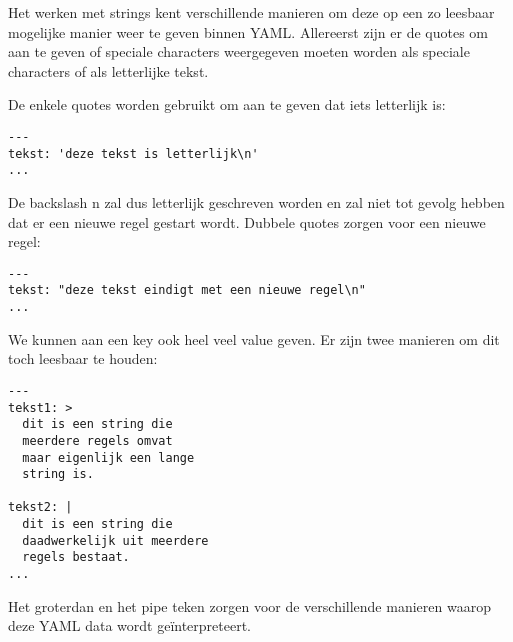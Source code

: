 Het werken met strings kent verschillende manieren om deze op een zo leesbaar mogelijke manier weer te geven binnen YAML. Allereerst zijn er de quotes om aan te geven of speciale characters weergegeven moeten worden als speciale characters of als letterlijke tekst.

De enkele quotes worden gebruikt om aan te geven dat iets letterlijk is:
\begin{verbatim}
---
tekst: 'deze tekst is letterlijk\n'
...
\end{verbatim}
De backslash n zal dus letterlijk geschreven worden en zal niet tot gevolg hebben dat er een nieuwe regel gestart wordt. Dubbele quotes zorgen voor een nieuwe regel:
\begin{verbatim}
---
tekst: "deze tekst eindigt met een nieuwe regel\n"
...
\end{verbatim}

We kunnen aan een key ook heel veel value geven. Er zijn twee manieren om dit toch leesbaar te houden:
\begin{verbatim}
---
tekst1: >
  dit is een string die
  meerdere regels omvat
  maar eigenlijk een lange
  string is.

tekst2: |
  dit is een string die
  daadwerkelijk uit meerdere
  regels bestaat.
...
\end{verbatim}
Het groterdan en het pipe teken zorgen voor de verschillende manieren waarop deze YAML data wordt ge\"interpreteert.

